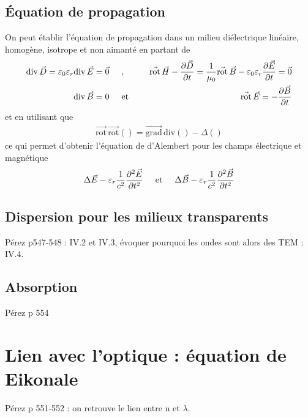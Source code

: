 \documentclass[12pt,prb,aps,epsf]{report}
\begin{document}
\subsection{Équation de propagation}
On peut établir l'équation de propagation dans un milieu diélectrique linéaire, homogène, isotrope et non aimanté en partant de
\begin{eqnarray}
\mathrm{div}\,\vec{D} = \varepsilon_0\varepsilon_r\mathrm{div}\,\vec{E} = \vec{0} \hspace{0.5cm} &,& \hspace{0.5cm} \vec{\mathrm{rot}}\,\vec{H} - \frac{\partial \vec{D}}{\partial t } = \frac{1}{\mu_0}\vec{\mathrm{rot}}\,\vec{B} - \varepsilon_0\varepsilon_r\frac{\partial \vec{E}}{\partial t } = \vec{0}\\
\mathrm{div}\,\vec{B} =  0 \hspace{0.5cm} &\mathrm{et}& \hspace{0.5cm} \vec{\mathrm{rot}}\,\vec{E} = - \frac{\partial\vec{B}}{\partial t}
\end{eqnarray}
et en utilisant que 
\begin{eqnarray}
\vec{\mathrm{rot}}\,\vec{\mathrm{rot}} () = \vec{\mathrm{grad}} \,\mathrm{div} () - \Delta ()
\end{eqnarray} 
ce qui permet d'obtenir l'équation de d'Alembert pour les champs électrique et magnétique
\begin{eqnarray}
\Delta \vec{E} - \varepsilon_r \frac{1}{c^2} \frac{\partial ^2 \vec{E}}{\partial t ^2} \hspace{0.5cm} \mathrm{et} \hspace{0.5cm}
\Delta \vec{B} - \varepsilon_r \frac{1}{c^2} \frac{\partial ^2 \vec{B}}{\partial t ^2}
\end{eqnarray}

\subsection{Dispersion pour les milieux transparents}
Pérez p547-548 : IV.2 et IV.3, évoquer pourquoi les ondes sont alors des TEM : IV.4.
\subsection{Absorption}
Pérez p 554
\section{Lien avec l'optique : équation de Eikonale}
Pérez p 551-552 : on retrouve le lien entre n et $\lambda$.\\
\end{document}
